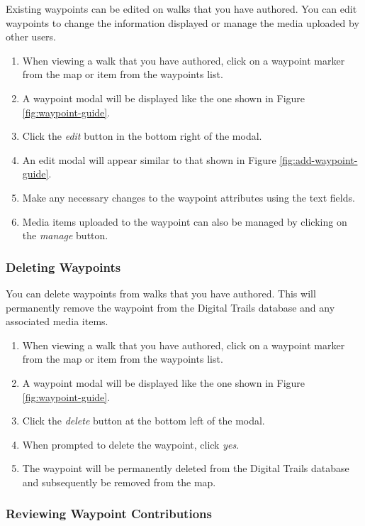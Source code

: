 \documentclass[11pt,a4paper]{report}
\begin{document}
Existing waypoints can be edited on walks that you have authored. You can edit waypoints to change the information displayed or manage the media uploaded by other users.

\begin{enumerate}
\item When viewing a walk that you have authored, click on a waypoint marker from the map or item from the waypoints list.
\item A waypoint modal will be displayed like the one shown in Figure \ref{fig:waypoint-guide}.
\item Click the \emph{edit} button in the bottom right of the modal.
\item An edit modal will appear similar to that shown in Figure \ref{fig:add-waypoint-guide}.
\item Make any necessary changes to the waypoint attributes using the text fields.
\item Media items uploaded to the waypoint can also be managed by clicking on the \emph{manage} button.
\end{enumerate}

\subsubsection{Deleting Waypoints}

You can delete waypoints from walks that you have authored. This will permanently remove the waypoint from the Digital Trails database and any associated media items.

\begin{enumerate}
\item When viewing a walk that you have authored, click on a waypoint marker from the map or item from the waypoints list.
\item A waypoint modal will be displayed like the one shown in Figure \ref{fig:waypoint-guide}.
\item Click the \emph{delete} button at the bottom left of the modal.
\item When prompted to delete the waypoint, click \emph{yes}.
\item The waypoint will be permanently deleted from the Digital Trails database and subsequently be removed from the map.
\end{enumerate}

\subsubsection{Reviewing Waypoint Contributions}
\end{document}
